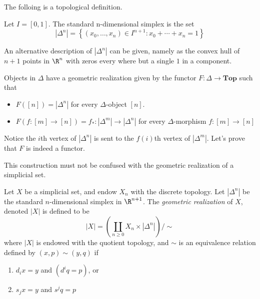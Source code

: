 
The folloing is a topological definition.
\begin{definition}
    Let \(I = [0,1]\). The standard n-dimensional simplex is the set
    \[|{\Delta}^n| = \left\{ (x_0, \dots, x_n)\in I^{n+1 } :  x_0 + \cdots + x_n = 1 \right\}\]
\end{definition}
\begin{remark}
    An alternative description of \(|\Delta^n|\)    can be given, namely as the convex hull of \(n+1\) points in \(\R^n\) with zeros every where but a single \(1\) in a component.
\end{remark}


Objects in \(\Delta\) have a geometric realization given by the  functor \(F\colon \Delta \to \mathbf{Top}\) such that 
\begin{itemize}
    \item \(F([n]) = |\Delta^n|\) for every \(\Delta\)-object \([n]\).
    \item \(F(f\colon [m] \to [n]) = f_*\colon |\Delta^m| \to |\Delta^n| \) for every \(\Delta\)-morphism \(f\colon [m]\to [n]\)
\end{itemize} 
Notice the \(i\)th vertex of \(|\Delta^n|\) is sent to the \(f(i)\)th vertex of \(|\Delta^m|\). 
Let's prove that \(F\) is indeed a functor.

\begin{remark}
    This construction must not be confused with the geometric realization of a simplicial set.
\end{remark}


\begin{definition}[Realization]
    Let \(X\) be a simplicial set, and endow \(X_n\) with the discrete topology.
    Let \(|\Delta^n|\) be the standard \(n\)-dimensional simplex in \(\R^{n+1}\).
    The \textit{geometric realization} of \(X\), denoted \(|X|\) is defined to be 
    \[|X| = \left( \coprod_{n\geq 0}  X_n \times  |\Delta^n| \right)/ \sim\]
    where \(|X|\) is endowed with the quotient topology, and \(\sim\) is an equivalence relation defined by \((x,p)\sim (y,q)\) if 
    \begin{enumerate}[label=(\roman*)]
        \item \(d_ix = y \) and \((d^iq = p)\), or 
        \item \(s_j x=y\) and \(s^j q = p\)
    \end{enumerate}
\end{definition}



